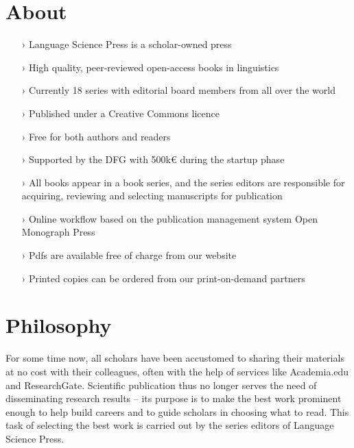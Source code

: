 \documentclass[
notumble,
nofoldmark,
]{leaflet}
\begin{document}
\section{\sffamily\Large\bfseries About}
\begin{itemize}  
\setlength{\itemsep}{-3pt} 
 \item[›] Language Science Press is a scholar-owned press
 \item[›]  High quality, peer-reviewed open-access books in linguistics
  \item[›] Currently 18 series with editorial board members from all over the world
 \item[›] Published under a Creative Commons licence
 \item[›] Free for both authors and readers
 \item[›] Supported by the DFG with 500k{\euro} during the startup phase

 \item[›] All books appear in a book series, and the series editors are responsible for acquiring, reviewing and selecting manuscripts for publication
 \item[›] Online workflow based on the publication management system Open Monograph Press
 \item[›] Pdfs are available free of charge from our website 
 \item[›] Printed copies can be ordered from our print-on-demand partners
\end{itemize}
 
 \section{\sffamily\Large\bfseries Philosophy} 
 For some time now, all scholars have been accustomed to sharing their materials at no cost with their colleagues, often with the help of services like Academia.edu and ResearchGate. Scientific publication thus no longer serves the need of disseminating research results -- its purpose is to make the best work prominent enough to help build careers and to guide scholars in choosing what to read. This task of selecting the best work is carried out by the series editors of Language Science Press.
\end{document}
